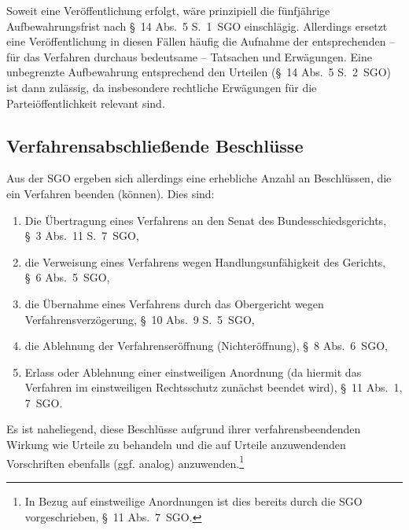 Soweit eine Veröffentlichung erfolgt, wäre prinzipiell die fünfjährige Aufbewahrungsfrist nach \S~14 Abs.~5 S.~1~SGO einschlägig.
Allerdings ersetzt eine Veröffentlichung in diesen Fällen häufig die Aufnahme der entsprechenden -- für das Verfahren durchaus bedeutsame -- Tatsachen und Erwägungen.
Eine unbegrenzte Aufbewahrung entsprechend den Urteilen (\S~14 Abs.~5 S.~2~SGO) ist dann zulässig, da insbesondere rechtliche Erwägungen für die Parteiöffentlichkeit relevant sind.


\subsection{Verfahrensabschließende Beschlüsse}
\label{Dokumentation:Beschlüsse:Verfahrensabschließend}
Aus der SGO ergeben sich allerdings eine erhebliche Anzahl an Beschlüssen, die ein Verfahren beenden (können).
Dies sind:
\begin{enumerate}
\item Die Übertragung eines Verfahrens an den Senat des Bundesschiedsgerichts, \S~3 Abs.~11 S.~7~SGO,
\item die Verweisung eines Verfahrens wegen Handlungsunfähigkeit des Gerichts, \S~6 Abs.~5~SGO,
\item die Übernahme eines Verfahrens durch das Obergericht wegen Verfahrensverzögerung, \S~10 Abs.~9 S.~5~SGO,
\item die Ablehnung der Verfahrenseröffnung (Nichteröffnung), \S~8 Abs.~6~SGO,
\item Erlass oder Ablehnung einer einstweiligen Anordnung (da hiermit das Verfahren im einstweiligen Rechtsschutz zunächst beendet wird), \S~11 Abs.~1, 7~SGO.
\end{enumerate}

Es ist naheliegend, diese Beschlüsse aufgrund ihrer verfahrensbeendenden Wirkung wie Urteile zu behandeln und die auf Urteile anzuwendenden Vorschriften ebenfalls (ggf. analog) anzuwenden.\footnote{In Bezug auf einstweilige Anordnungen ist dies bereits durch die SGO vorgeschrieben, \S~11 Abs.~7~SGO.}

